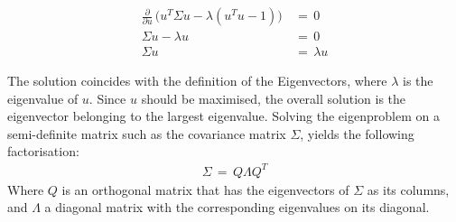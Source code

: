 \documentclass[a4paper, 11pt]{article}
\begin{document}
\begin{align*}
 \frac{\partial}{\partial u}\, \big(u^T \Sigma u - \lambda(u^T u - 1)\big)\, & =\, 0 \\
 \Sigma u - \lambda u\, & =\, 0 \\
 \Sigma u\, & =\, \lambda u 
\end{align*}

The solution coincides with the definition of the Eigenvectors, where $\lambda$ is the eigenvalue of $u$. Since $u$ should be maximised, the overall solution is the eigenvector belonging to the largest eigenvalue.
Solving the eigenproblem on a semi-definite matrix such as the covariance matrix $\Sigma$, yields the following factorisation:
\begin{align*}
\Sigma\, =\, Q \Lambda Q^T
\end{align*}
Where $Q$ is an orthogonal matrix that has the eigenvectors of $\Sigma$ as its columns, and $\Lambda$ a diagonal matrix with the corresponding eigenvalues on its diagonal.
\end{document}
